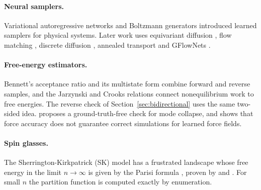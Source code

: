 \paragraph{Neural samplers.} Variational autoregressive networks \citep{wu2019van} and Boltzmann generators \citep{noe2019boltzmann} introduced learned samplers for physical systems. Later work uses equivariant diffusion \citep{hoogeboom2022edm,satorras2021egnn}, flow matching \citep{lipman2023flowmatching,albergo2023building,bose2023se3flow}, discrete diffusion \citep{austin2021d3pm,zhu2025mdns,du2026metadns}, annealed transport \citep{holderrieth2025leaps} and GFlowNets \citep{bengio2021gfn,malkin2022tb}.

\paragraph{Free-energy estimators.} Bennett's acceptance ratio \citep{bennett1976bar} and its multistate form \citep{shirts2008mbar} combine forward and reverse samples, and the Jarzynski and Crooks relations \citep{jarzynski1997nonequilibrium,crooks1999entropy} connect nonequilibrium work to free energies. The reverse check of Section~\ref{sec:bidirectional} uses the same two-sided idea. \citet{xu2026modecollapse} proposes a ground-truth-free check for mode collapse, and \citet{fu2023forces} shows that force accuracy does not guarantee correct simulations for learned force fields.

\paragraph{Spin glasses.} The Sherrington-Kirkpatrick (SK) model \citep{sk1975} has a frustrated landscape whose free energy in the limit $n\to\infty$ is given by the Parisi formula \citep{parisi1980}, proven by \citet{guerra2003} and \citet{talagrand2006}. For small $n$ the partition function is computed exactly by enumeration.
